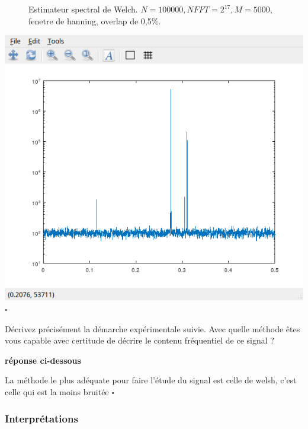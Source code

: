 \documentclass{article}
\newcommand{\debutrep}[1]{\color{blue}\begin{center} \hrulefill \textbf{ #1 } \hrulefill \end{center} }
\newcommand{\finrep}{\vspace*{5mm}\hfill $\square$\color{black}\vspace*{5mm}}
\begin{document}
\begin{figure}[H]

\caption{Estimateur spectral de Welch. $N=100000, NFFT=2^{17}, M=5000$, fenetre de hanning, overlap de 0,5\%.}
\end{figure}
\includegraphics[width=\columnwidth]{Part4welc.png}
\finrep

Décrivez précisément la démarche expérimentale suivie. Avec quelle méthode êtes vous capable avec certitude de décrire le contenu fréquentiel de ce signal ?

\debutrep{réponse ci-dessous}
La méthode le plus adéquate pour faire l'étude du signal est celle de welsh, c'est celle qui est la moins bruitée
\finrep

\subsubsection{Interprétations}
\end{document}
